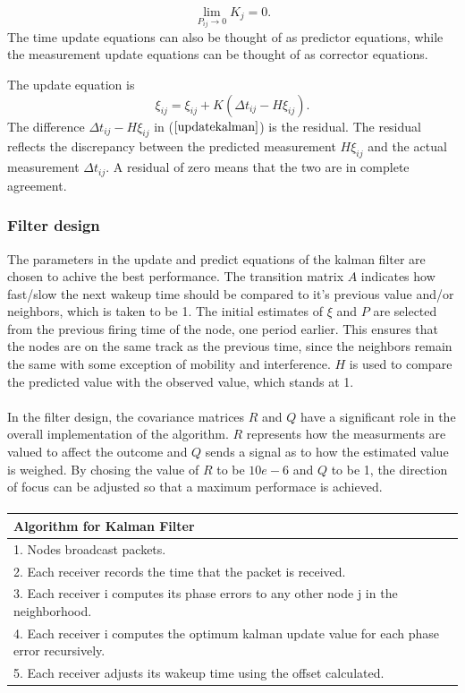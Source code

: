 \documentclass[a4paper,10pt]{report}
\begin{document}
\begin{equation}
\mathop {\lim }\limits_{P_{ij} \to 0 } {K_j} = 0.
\end{equation}
The time update equations can also be thought of as predictor
equations, while the measurement update equations can be thought of
as corrector equations.
\par
The update equation is
\begin{equation}
\xi_{ij} = \xi_{ij} + K(\Delta t_{ij}-H\xi_{ij}).
\label{updatekalman}
\end{equation}
The difference $\Delta t_{ij} - H\xi_{ij}$ in ($\ref{updatekalman}$) is the
residual. The residual reflects the discrepancy between the
predicted measurement $H\xi_{ij}$ and the actual measurement
$\Delta t_{ij}$. A residual of zero means that the two are in complete
agreement.
\subsubsection{Filter design}
The parameters in the update and predict equations of the kalman filter are chosen to achive the best performance. 
The transition matrix $A$ indicates how fast/slow the next wakeup
time should be compared to it's previous value and/or neighbors, which is taken to be 1. The
initial estimates of $\xi$ and $P$ are selected from the previous
firing time of the node, one period earlier. This ensures that the
nodes are on the same track as the previous time, since the
neighbors remain the same with some exception of mobility and
interference. $H$ is used to compare the predicted value with the
observed value, which stands at 1. \paragraph*{} In the filter design, the covariance
matrices $R$ and $Q$ have a significant role in the overall
implementation of the algorithm. $R$ represents how the measurments
are valued to affect the outcome and $Q$ sends a signal as to how
the estimated value is weighed. By chosing the value of $R$ to be $10e-6$  and $Q$ to be 1,
the direction of focus can be adjusted so that a maximum performace is achieved.
\paragraph*{}
\begin{tabular}{  l }Algorithm for Kalman Filter \\ \hline \hline
1. Nodes broadcast packets. \\  2. Each receiver records the time that the packet is received. \\
3. Each receiver i computes its phase errors to any other node j in the neighborhood. \\
4. Each receiver i computes the optimum kalman update value for each phase error recursively. \\
5. Each receiver adjusts its wakeup time using the offset calculated.\\
\hline \hline
\end{tabular}
\end{document}
